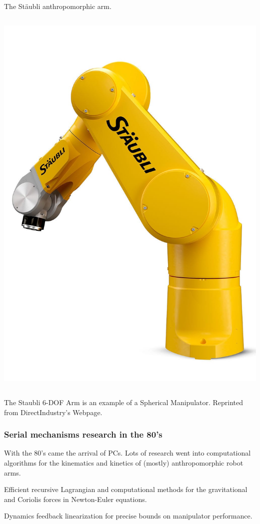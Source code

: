 \begin{frame}
	\begin{block}{The St{\"a}ubli anthropomorphic arm.}
		\begin{columns}[t]
			\begin{column}{10cm}
				\centering
				\includegraphics[scale=.1, width=.5\textwidth, rotate=-90]{../Notes/figures/Staubli.jpg}
			\end{column}
		\end{columns}
		\footnotesize{The Staubli 6-DOF Arm is an example of a Spherical Manipulator. Reprinted from DirectIndustry's Webpage.}
	\end{block}
\end{frame}

\begin{frame}
\frametitle{Serial mechanisms research in the 80's}
%
\begin{tcolorbox}[toggle enlargement=none]
With the 80's came the arrival of PCs. Lots of research went into computational algorithms for the kinematics and kinetics of (mostly) anthropomorphic robot arms.
\end{tcolorbox}
\begin{tcolorbox}[coltitle=magenta!70,colframe=blue!80!red,title=Active control schemes,toggle enlargement=forced]
Efficient recursive Lagrangian and computational methods for the gravitational and Coriolis forces in Newton-Euler equations.
\end{tcolorbox}
\begin{tcolorbox}[coltitle=pink!70,colframe=gray!80!red,title=Feedback Linearization,toggle enlargement=evenpage]
Dynamics feedback linearization for precise bounds on manipulator performance.
\end{tcolorbox}
\end{frame}

